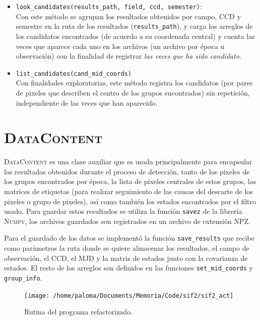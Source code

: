 \begin{itemize}
\item \texttt{look\_candidates(results\_path, field, ccd, semester)}:\\
Con este m\'etodo se agrupan los resultados obtenidos por campo, CCD y semestre en la ruta de los resultados (\texttt{results\_path}), y carga los arreglos de los candidatos encontrados (de acuerdo a su coordenada central) y cuenta las veces que aparece cada uno en los archivos (un archivo por \'epoca u observaci\'on) con la finalidad de registrar \textit{las veces que ha sido candidato}.  
\bigskip

\item \texttt{list\_candidates(cand\_mid\_coords)}\\
Con finalidades exploratorias, este m\'etodo registra los candidatos (por pares de pixeles que describen el centro de los grupos encontrados) sin repetici\'on, independiente de las veces que han aparecido.
\end{itemize}

  
\section{\textsc{DataContent}}
\textsc{DataContent} es una clase auxiliar que es usada principalmente para encapsular los resultados obtenidos durante el proceso de detecci\'on, tanto de los pixeles de los grupos encontrados por \'epoca, la lista de pixeles centrales de estos grupos, las matrices de etiquetas (para realizar seguimiento de las causas del descarte de los pixeles o grupo de pixeles), as\'i como tambi\'en los estados encontrados por el filtro usado. Para guardar estos resultados se utiliza la funci\'on \texttt{savez} de la librer\'ia \textsc{Numpy}, los archivos guardados son registrados en un archivo de extensi\'on NPZ.
\bigskip

Para el guardado de los datos se implement\'o la funci\'on \texttt{save\_results} que recibe como par\'ametros la ruta donde se quiere almacenar los resultados, el campo de observaci\'on, el CCD, el MJD y la matriz de estados junto con la covarianza de estados. El resto de los arreglos son definidos en las funciones \texttt{set\_mid\_coords} y \texttt{group\_info}.

\begin{figure}
\centering
\texttt{[image: /home/paloma/Documents/Memoria/Code/sif2/sif2\_act]}
\label{fig:new_routine}
\caption{Rutina del programa refactorizado.}
\end{figure}



